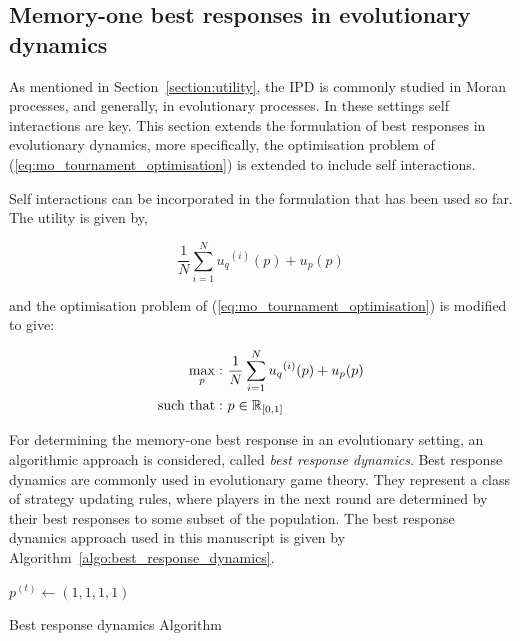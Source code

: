 \subsection{Memory-one best responses in evolutionary dynamics}\label{subsection:best_respnse_evolutionary_setting}

As mentioned in Section~\ref{section:utility}, the IPD is commonly studied in
Moran processes, and generally, in evolutionary processes. In these settings self
interactions are key. This section extends the formulation of best responses
in evolutionary dynamics, more specifically, the optimisation problem of
(\ref{eq:mo_tournament_optimisation}) is extended to
include self interactions.

Self interactions can be incorporated in the formulation
that has been used so far. The utility is given by,

\begin{equation}
    \frac{1}{N} \sum\limits_{i=1} ^ {N} {u_q}^{(i)} (p) + u_p(p)
\end{equation}

and the optimisation problem of (\ref{eq:mo_tournament_optimisation}) is modified to give:

\begin{equation}\label{eq:mo_evolutionary_optimisation}
    \begin{aligned}
    \max_p: & \ \frac{1}{N} \sum\limits_{i=1} ^ {N} {u_q}^{(i)} (p) + u_p(p)
    \\
    \text{such that}: & \ p \in \mathbb{R}_{[0, 1]}
    \end{aligned}
\end{equation}

For determining the memory-one best response in an evolutionary setting,
an algorithmic approach is considered, called \textit{best
response dynamics}. Best response dynamics are commonly used in evolutionary
game theory. They represent a class of strategy updating rules, where players in
the next round are determined by their best responses to some subset of the
population. The best response dynamics approach used in this manuscript is given by
Algorithm~\ref{algo:best_response_dynamics}.

\begin{minipage}{.6\textwidth}
    \begin{algorithm}[H]
        $p^{(t)}\leftarrow (1, 1, 1, 1)$\;
        \caption{Best response dynamics Algorithm}
        \label{algo:best_response_dynamics}
    \end{algorithm}
\end{minipage}

